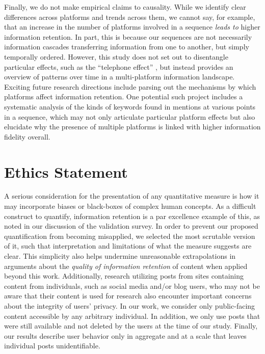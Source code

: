 \documentclass[letterpaper]{article} %
\begin{document}
Finally, we do not make empirical claims to causality. While we identify clear differences across platforms and trends across them, we cannot say, for example, that an increase in the number of platforms involved in a sequence \emph{leads to} higher information retention. In part, this is because our sequences are not necessarily information cascades transferring information from one to another, but simply temporally ordered. However, this study does not set out to disentangle particular effects, such as the ``telephone effect'' \citep{ribeiroMessageDistortionInformation2019}, but instead provides an overview of patterns over time in a multi-platform information landscape. Exciting future research directions include parsing out the mechanisms by which platforms affect information retention. One potential such project includes a systematic analysis of the kinds of keywords found in mentions at various points in a sequence, which may not only articulate particular platform effects but also elucidate why the presence of multiple platforms is linked with higher information fidelity overall.

\section{Ethics Statement}
A serious consideration for the presentation of any quantitative measure is how it may incorporate biases or black-boxes of complex human concepts. As a difficult construct to quantify, information retention is a par excellence example of this, as noted in our discussion of the validation survey. In order to prevent our proposed quantification from becoming misapplied, we selected the most scrutable version of it, such that interpretation and limitations of what the measure suggests are clear. This simplicity also helps undermine unreasonable extrapolations in arguments about the \emph{quality of information retention} of content when applied beyond this work.
Additionally, research utilizing posts from sites containing content from individuals, such as social media and/or blog users, who may not be aware that their content is used for research also encounter important concerns about the integrity of users' privacy. In our work, we consider only public-facing content accessible by any arbitrary individual. In addition, we only use posts that were still available and not deleted by the users at the time of our study. Finally, our results describe user behavior only in aggregate and at a scale that leaves individual posts unidentifiable.
\end{document}
